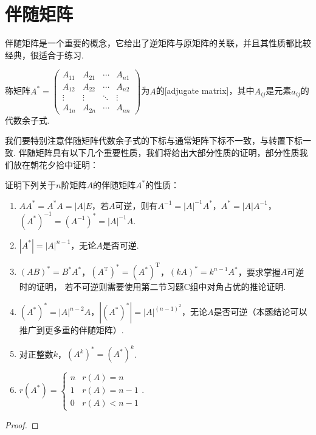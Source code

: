 \section{伴随矩阵}
伴随矩阵是一个重要的概念，它给出了逆矩阵与原矩阵的关联，并且其性质都比较经典，很适合于练习.
\begin{definition}
    称矩阵$A^*=\begin{pmatrix}
        A_{11} & A_{21} & \cdots & A_{n1} \\
        A_{12} & A_{22} & \cdots & A_{n2} \\
        \vdots & \vdots & \ddots & \vdots \\
        A_{1n} & A_{2n} & \cdots & A_{nn}
    \end{pmatrix}$为$A$的[adjugate matrix]，其中$A_{ij}$是元素$a_{ij}$的代数余子式.
\end{definition}
我们要特别注意伴随矩阵代数余子式的下标与通常矩阵下标不一致，与转置下标一致.
伴随矩阵具有以下几个重要性质，我们将给出大部分性质的证明，部分性质我们放在朝花夕拾中证明：
\begin{example} \label{ex:13:伴随矩阵}
    证明下列关于$n$阶矩阵$A$的伴随矩阵$A^*$的性质：
    \begin{enumerate}
        \item $AA^*=A^*A=|A|E$，若$A$可逆，则有$A^{-1}=|A|^{-1}A^*$，$A^*=|A|A^{-1}$，$(A^*)^{-1}=(A^{-1})^*=|A|^{-1}A$.

        \item $|A^*|=|A|^{n-1}$，无论$A$是否可逆.

        \item $(AB)^*=B^*A^*$，$(A^\mathrm{T})^*=(A^*)^\mathrm{T}$，$(kA)^*=k^{n-1}A^*$，要求掌握$A$可逆时的证明，
        若不可逆则需要使用第二节习题C组中对角占优的推论证明.

        \item $(A^*)^*=|A|^{n-2}A$，$|(A^*)^*|=|A|^{(n-1)^2}$，无论$A$是否可逆（本题结论可以推广到更多重的伴随矩阵）.

        \item 对正整数$k$，$(A^k)^*=(A^*)^k$.

        \item $r(A^*)=\begin{cases}
            n & r(A)=n \\ 1 & r(A)=n-1 \\ 0 & r(A) < n-1
        \end{cases}$.
    \end{enumerate}
\end{example}
\begin{proof}

\end{proof}

